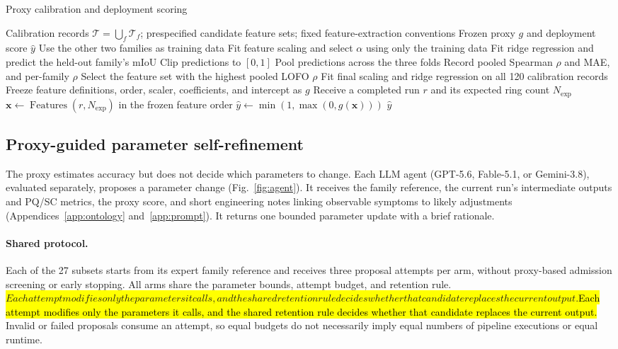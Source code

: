 \documentclass[a4paper,fleqn]{cas-dc}
\let\texthl\hl
\renewcommand{\hl}[1]{\ifmmode\colorbox{yellow}{\ensuremath{#1}}\else\texthl{#1}\fi}
\begin{document}
\begin{algorithm}[ht]
\caption{Proxy calibration and deployment scoring}
\label{alg:proxy}
\begin{algorithmic}[1]
\Require Calibration records $\mathcal{T}=\bigcup_f\mathcal{T}_f$; prespecified candidate feature sets; fixed feature-extraction conventions
\Ensure Frozen proxy $g$ and deployment score $\hat{y}$
        \State Use the other two families as training data
        \State Fit feature scaling and select $\alpha$ using only the training data
        \State Fit ridge regression and predict the held-out family's mIoU
        \State Clip predictions to $[0,1]$
    \EndFor
    \State Pool predictions across the three folds
    \State Record pooled Spearman $\rho$ and MAE, and per-family $\rho$
\EndFor
\State Select the feature set with the highest pooled LOFO $\rho$
\State Fit final scaling and ridge regression on all 120 calibration records
\State Freeze feature definitions, order, scaler, coefficients, and intercept as $g$
\Statex
\State Receive a completed run $r$ and its expected ring count $N_{\mathrm{exp}}$
\State $\mathbf{x}\gets\operatorname{Features}(r,N_{\mathrm{exp}})$ in the frozen feature order
\State $\hat{y}\gets\min(1,\max(0,g(\mathbf{x})))$
\State \Return $\hat{y}$
\end{algorithmic}
\end{algorithm}


\subsection{Proxy-guided parameter self-refinement}
\label{sec:agent-design}

The proxy estimates accuracy but does not decide which parameters to change. Each LLM agent (GPT-5.6, Fable-5.1, or Gemini-3.8), evaluated separately, proposes a parameter change (Fig.~\ref{fig:agent}). It receives the family reference, the current run's intermediate outputs and PQ/SC metrics, the proxy score, and short engineering notes linking observable symptoms to likely adjustments (Appendices~\ref{app:ontology} and~\ref{app:prompt}). It returns one bounded parameter update with a brief rationale.

\paragraph{Shared protocol.}
Each of the 27 subsets starts from its expert family reference and receives three proposal attempts per arm, without proxy-based admission screening or early stopping. All arms share the parameter bounds, attempt budget, and retention rule. \hl{Each attempt modifies only the parameters it calls, and the shared retention rule decides whether that candidate replaces the current output. } Invalid or failed proposals consume an attempt, so equal budgets do not necessarily imply equal numbers of pipeline executions or equal runtime.
\end{document}
